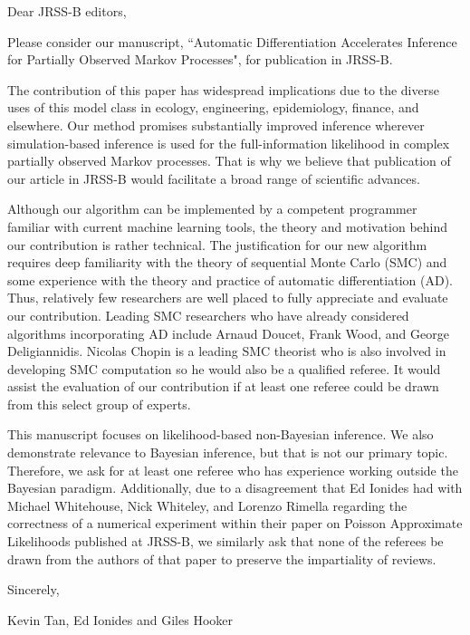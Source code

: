 \documentclass[11pt]{article}
\begin{document}
\noindent Dear JRSS-B editors,
\newline

Please consider our manuscript, ``Automatic Differentiation Accelerates Inference for Partially Observed Markov Processes", for publication in JRSS-B.

The contribution of this paper has widespread implications due to the diverse uses of this model class in ecology, engineering, epidemiology, finance, and elsewhere. Our method promises substantially improved inference wherever simulation-based inference is used for the full-information likelihood in complex partially observed Markov processes. That is why we believe that publication of our article in JRSS-B would facilitate a broad range of scientific advances. 

Although our algorithm can be implemented by a competent programmer familiar with current machine learning tools, the theory and motivation behind our contribution is rather technical. The justification for our new algorithm requires deep familiarity with the theory of sequential Monte Carlo (SMC) and some experience with the theory and practice of automatic differentiation (AD). Thus, relatively few researchers are well placed to fully appreciate and evaluate our contribution. Leading SMC researchers who have already considered algorithms incorporating AD include Arnaud Doucet, Frank Wood, and George Deligiannidis. Nicolas Chopin is a leading SMC theorist who is also involved in developing SMC computation so he would also be a qualified referee. It would assist the evaluation of our contribution if at least one referee could be drawn from this select group of experts.

This manuscript focuses on likelihood-based non-Bayesian inference. We also demonstrate relevance to Bayesian inference, but that is not our primary topic. Therefore, we ask for at least one referee who has experience working outside the Bayesian paradigm. Additionally, due to a disagreement that Ed Ionides had with Michael Whitehouse, Nick Whiteley, and Lorenzo Rimella regarding the correctness of a numerical experiment within their paper on Poisson Approximate Likelihoods published at JRSS-B, we similarly ask that none of the referees be drawn from the authors of that paper to preserve the impartiality of reviews.

\vspace{3ex}

\noindent Sincerely,

\noindent Kevin Tan, Ed Ionides and Giles Hooker
\end{document}
